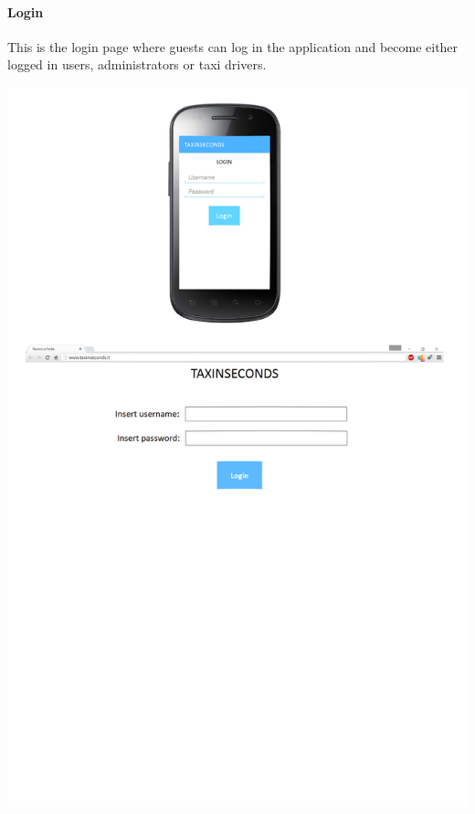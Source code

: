 \documentclass{article}
\begin{document}
\paragraph{Login}
This is the login page where guests can log in the application and become either logged in users, administrators or taxi drivers.\\
\begin{center}
	\includegraphics[width=.9\textwidth,height=.9\textheight,keepaspectratio]{LoginInterface}
\end{center}
\clearpage
\end{document}
